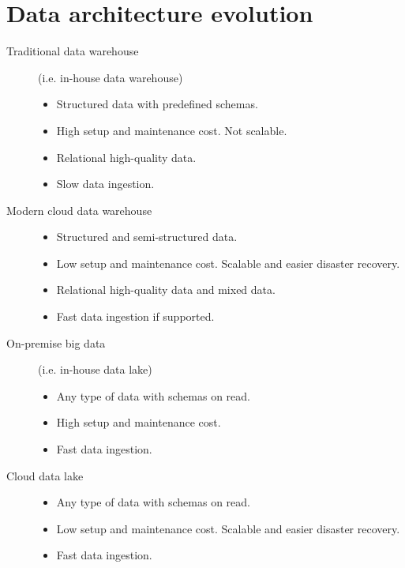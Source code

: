\section{Data architecture evolution}
\begin{description}
    \item[Traditional data warehouse]  
        (i.e. in-house data warehouse)
        \begin{itemize}
            \item Structured data with predefined schemas.
            \item High setup and maintenance cost. Not scalable.
            \item Relational high-quality data.
            \item Slow data ingestion.
        \end{itemize}

    \item[Modern cloud data warehouse]  
        \phantom{}
        \begin{itemize}
            \item Structured and semi-structured data.
            \item Low setup and maintenance cost. Scalable and easier disaster recovery.
            \item Relational high-quality data and mixed data.
            \item Fast data ingestion if supported.
        \end{itemize}

    \item[On-premise big data]  
        (i.e. in-house data lake)
        \begin{itemize}
            \item Any type of data with schemas on read.
            \item High setup and maintenance cost.
            \item Fast data ingestion.
        \end{itemize}

    \item[Cloud data lake]  
        \phantom{}
        \begin{itemize}
            \item Any type of data with schemas on read.
            \item Low setup and maintenance cost. Scalable and easier disaster recovery.
            \item Fast data ingestion.
        \end{itemize}
\end{description}


